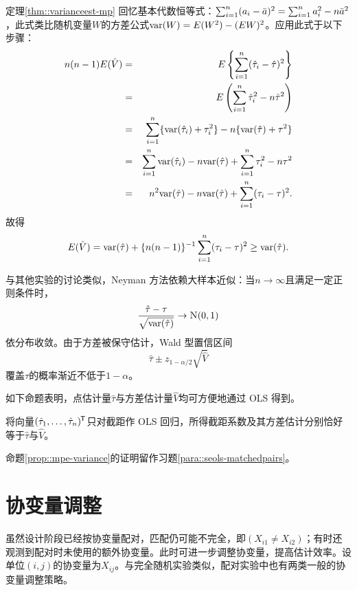 \begin{myproof}{定理}{\ref{thm::varianceest-mp}}
回忆基本代数恒等式：$\sum_{i=1}^n (a_i - \bar a)^2 = \sum_{i=1}^n a_i^2 - n \bar{a}^2$，此式类比随机变量$W$的方差公式$\textup{var}(W) = E(W^2) - (EW)^2$。应用此式于以下步骤：  
\begin{eqnarray*}
n(n-1) E( \hat{V} ) &=& E\left\{   \sum_{i=1}^n (\hat{\tau}_i - \hat{\tau})^2 \right\}  \\
&=&  E\left (    \sum_{i=1}^n \hat{\tau}_i^2 - n \hat{\tau}^2  \right)   \\
&=& \sum_{i=1}^n \{  \textup{var}(\hat{\tau}_i) + \tau_i^2 \} - n \{  \textup{var}(\hat{\tau})  + \tau^2 \}\\
&=& \sum_{i=1}^n  \textup{var}(\hat{\tau}_i)  - n \textup{var}(\hat{\tau}) + \sum_{i=1}^n  \tau_i^2 - n  \tau^2 \\
&=& n^2 \textup{var}(\hat{\tau})  - n \textup{var}(\hat{\tau})  + \sum_{i=1}^n (\tau_i - \tau)^2.
\end{eqnarray*}
故得  
$$
E( \hat{V} )  = \textup{var}(\hat{\tau})  + \{ n(n-1)  \}^{-1}   \sum_{i=1}^n (\tau_i - \tau)^2 \geq  \textup{var}(\hat{\tau})  .
$$
\end{myproof}




与其他实验的讨论类似，Neyman 方法依赖大样本近似：当$n\rightarrow \infty$且满足一定正则条件时，
$$
\frac{  \hat\tau  -  \tau }{  \sqrt{\var( \hat\tau )} } \rightarrow \N01
$$
依分布收敛。由于方差被保守估计，Wald 型置信区间
$$
 \hat\tau   \pm     z_{1-\alpha/2}  \sqrt{ \hat{V} }
$$
覆盖$\tau$的概率渐近不低于$1-\alpha$。



如下命题表明，点估计量$\hat\tau$与方差估计量$\hat{V}$均可方便地通过 OLS 得到。 

\begin{proposition}\label{prop::mpe-variance}
将向量$(\hat{\tau}_1, \ldots, \hat{\tau}_n)^{\mkern-1.5mu\mathsf{T}}$只对截距作 OLS 回归，所得截距系数及其方差估计分别恰好等于$\hat\tau$与$\hat{V}$。
\end{proposition}

  命题\ref{prop::mpe-variance}的证明留作习题\ref{para::seols-matchedpairs}。 
  
  

\section{协变量调整}



虽然设计阶段已经按协变量配对，匹配仍可能不完全，即$(X_{i1}\neq X_{i2})$；有时还观测到配对时未使用的额外协变量。此时可进一步调整协变量，提高估计效率。设单位$(i, j)$的协变量为$X_{ij} $。与完全随机实验类似，配对实验中也有两类一般的协变量调整策略。 



